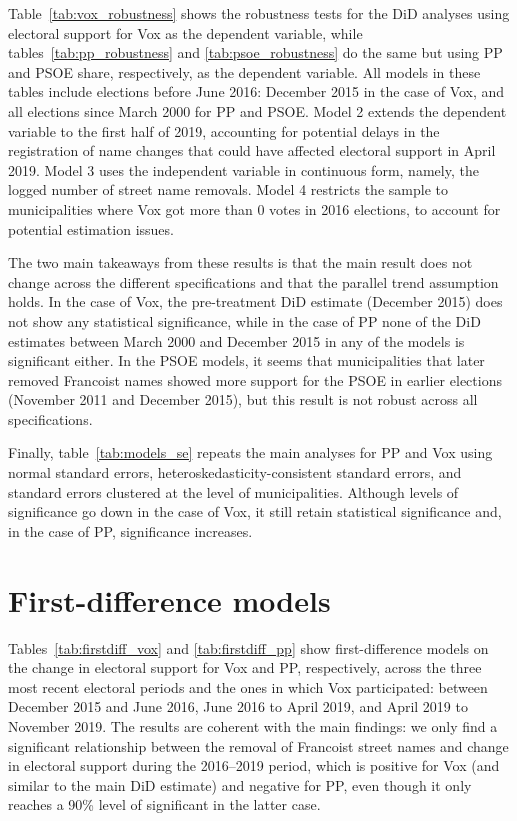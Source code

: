 \documentclass[12pt, titlepage]{article}
\begin{document}
Table~\ref{tab:vox_robustness} shows the robustness tests for the DiD analyses using electoral support for Vox as the dependent variable, while tables~\ref{tab:pp_robustness} and \ref{tab:psoe_robustness} do the same but using PP and PSOE share, respectively, as the dependent variable.
All models in these tables include elections before June 2016: December 2015 in the case of Vox, and all elections since March 2000 for PP and PSOE.
Model 2 extends the dependent variable to the first half of 2019, accounting for potential delays in the registration of name changes that could have affected electoral support in April 2019.
Model 3 uses the independent variable in continuous form, namely, the logged number of street name removals.
Model 4 restricts the sample to municipalities where Vox got more than 0 votes in 2016 elections, to account for potential estimation issues.

The two main takeaways from these results is that the main result does not change across the different specifications and that the parallel trend assumption holds.
In the case of Vox, the pre-treatment DiD estimate (December 2015) does not show any statistical significance, while in the case of PP none of the DiD estimates between March 2000 and December 2015 in any of the models is significant either.
In the PSOE models, it seems that municipalities that later removed Francoist names showed more support for the PSOE in earlier elections (November 2011 and December 2015), but this result is not robust across all specifications.

Finally, table~\ref{tab:models_se} repeats the main analyses for PP and Vox using normal standard errors, heteroskedasticity-consistent standard errors, and standard errors clustered at the level of municipalities.
Although levels of significance go down in the case of Vox, it still retain statistical significance and, in the case of PP, significance increases.







\clearpage
\section{First-difference models}\label{app:first_diff}

Tables~\ref{tab:firstdiff_vox} and \ref{tab:firstdiff_pp} show first-difference models on the change in electoral support for Vox and PP, respectively, across the three most recent electoral periods and the ones in which Vox participated: between December 2015 and June 2016, June 2016 to April 2019, and April 2019 to November 2019.
The results are coherent with the main findings: we only find a significant relationship between the removal of Francoist street names and change in electoral support during the 2016--2019 period, which is positive for Vox (and similar to the main DiD estimate) and negative for PP, even though it only reaches a 90\% level of significant in the latter case.



\end{document}
